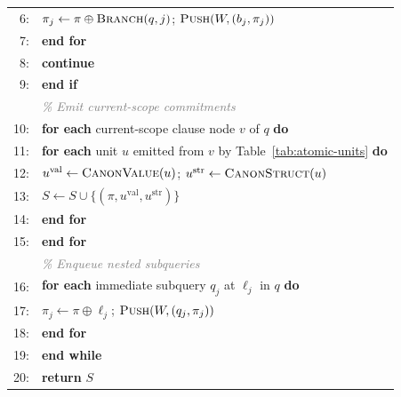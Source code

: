 \begin{algorithm}[t]
\begin{tabularx}{\linewidth}{
    @{}r@{\hspace{0.75em}}
    >{\raggedright\arraybackslash}X@{}
}
6: &
\hspace*{3.6em}
$\pi_j\gets\pi\oplus\textsc{Branch}(q,j)$;
$\textsc{Push}(W,(b_j,\pi_j))$
\\

7: &
\hspace*{2.4em}
\textbf{end for}
\\

8: &
\hspace*{2.4em}
\textbf{continue}
\\

9: &
\hspace*{1.2em}
\textbf{end if}
\\[2pt]

&
\textcolor{gray}{\itshape\% Emit current-scope commitments}
\\[-1pt]

10: &
\hspace*{1.2em}
\textbf{for each} current-scope clause node $v$ of $q$
\textbf{do}
\\

11: &
\hspace*{2.4em}
\textbf{for each} unit $u$ emitted from $v$ by
Table~\ref{tab:atomic-units} \textbf{do}
\\

12: &
\hspace*{3.6em}
$u^{\mathrm{val}}\gets\textsc{CanonValue}(u)$;
$u^{\mathrm{str}}\gets\textsc{CanonStruct}(u)$
\\

13: &
\hspace*{3.6em}
$S\gets S\cup
\{(\pi,u^{\mathrm{val}},u^{\mathrm{str}})\}$
\\

14: &
\hspace*{2.4em}
\textbf{end for}
\\

15: &
\hspace*{1.2em}
\textbf{end for}
\\[2pt]

&
\textcolor{gray}{\itshape\% Enqueue nested subqueries}
\\[-1pt]

16: &
\hspace*{1.2em}
\textbf{for each} immediate subquery $q_j$ at $\ell_j$ in $q$
\textbf{do}
\\

17: &
\hspace*{2.4em}
$\pi_j\gets\pi\oplus\ell_j$;
$\textsc{Push}(W,(q_j,\pi_j))$
\\

18: &
\hspace*{1.2em}
\textbf{end for}
\\

19: &
\textbf{end while}
\\[2pt]

20: &
\textbf{return} $S$
\\

\end{tabularx}

\end{algorithm}

